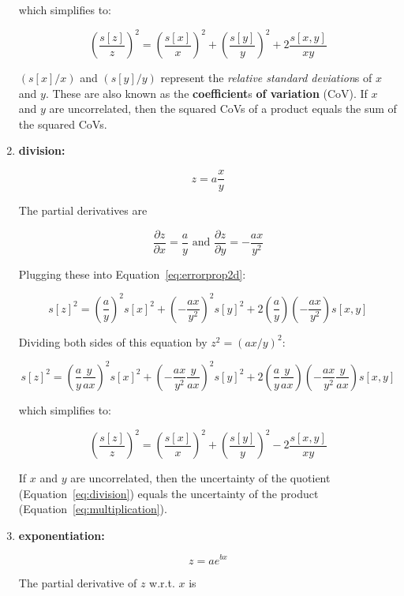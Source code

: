 \begin{enumerate}
  which simplifies to:

  \begin{equation}
    \left(\frac{s[z]}{z}\right)^2 = \left(\frac{s[x]}{x}\right)^2 +
    \left(\frac{s[y]}{y}\right)^2 + 2 \frac{s[x,y]}{x y}
    \label{eq:multiplication}
  \end{equation}

  $(s[x]/x)$ and $(s[y]/y)$ represent the \textit{relative standard
    deviation}s of $x$ and $y$. These are also known as the
  \textbf{coefficient}s \textbf{of variation} (CoV).  If $x$ and $y$
  are uncorrelated, then the squared CoVs of a product equals the sum
  of the squared CoVs.

\item{\bf division:}

  \[
  z = a \frac{x}{y}
  \]

  The partial derivatives are

  \[
  \frac{\partial z}{\partial x} = \frac{a}{y} \mbox{~and~}
  \frac{\partial z}{\partial y} = -\frac{a x}{y^2}
  \]

  Plugging these into Equation~\ref{eq:errorprop2d}:

  \[
  s[z]^2 = \left(\frac{a}{y}\right)^2 s[x]^2 +
  \left(-\frac{a x}{y^2}\right)^2 s[y]^2 +
  2\left(\frac{a}{y}\right)\left(-\frac{a x}{y^2}\right) s[x,y]
  \]

  Dividing both sides of this equation by $z^2 =
  \left(a x / y\right)^2$:
  
  \[
  s[z]^2 = \left(\frac{a}{y}\frac{y}{ax}\right)^2 s[x]^2 +
  \left(-\frac{a x}{y^2}\frac{y}{ax}\right)^2 s[y]^2 +
  2\left(\frac{a}{y}\frac{y}{ax}\right)
  \left(-\frac{a x}{y^2}\frac{y}{ax}\right) s[x,y]
  \]

  which simplifies to:

  \begin{equation}
    \left(\frac{s[z]}{z}\right)^2 = \left(\frac{s[x]}{x}\right)^2 +
    \left(\frac{s[y]}{y}\right)^2 - 2 \frac{s[x,y]}{x y}
    \label{eq:division}
  \end{equation}

  If $x$ and $y$ are uncorrelated, then the uncertainty of the
  quotient (Equation~\ref{eq:division}) equals the uncertainty of the
  product (Equation~\ref{eq:multiplication}).

\item{\bf exponentiation:}

  \[
  z = a e^{bx}
  \]

  The partial derivative of $z$ w.r.t. $x$ is


\end{enumerate}
